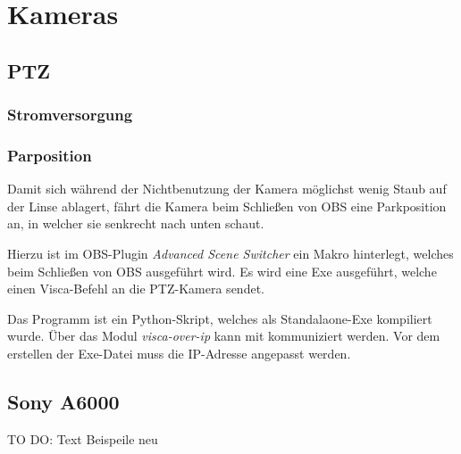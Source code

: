 \chapter{Kameras}
	\section{PTZ}
		\subsection{Stromversorgung}

		\subsection{Parposition}
			Damit sich während der Nichtbenutzung der Kamera möglichst wenig Staub auf der Linse ablagert, fährt die Kamera beim Schließen von OBS eine Parkposition an, in welcher sie senkrecht nach unten schaut.

			Hierzu ist im \Gls{OBS}-Plugin \textit{Advanced Scene Switcher} ein Makro hinterlegt, welches beim Schließen von OBS ausgeführt wird.
			Es wird eine Exe ausgeführt, welche einen \Gls{Visca}-Befehl an die \Gls{PTZ-Kamera} sendet.

			Das Programm ist ein Python-Skript, welches als Standalaone-Exe kompiliert wurde.
			Über das Modul \textit{visca-over-ip} kann mit  kommuniziert werden.
			Vor dem erstellen der Exe-Datei muss die IP-Adresse angepasst werden.
	\section{Sony A6000}
	TO DO: Text Beispeile neu